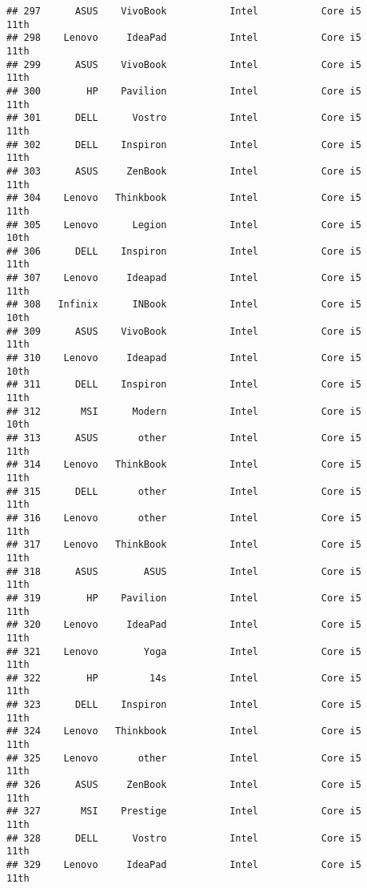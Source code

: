 \documentclass[
]{article}
\begin{document}
\begin{verbatim}
## 297      ASUS    VivoBook           Intel           Core i5            11th
## 298    Lenovo     IdeaPad           Intel           Core i5            11th
## 299      ASUS    VivoBook           Intel           Core i5            11th
## 300        HP    Pavilion           Intel           Core i5            11th
## 301      DELL      Vostro           Intel           Core i5            11th
## 302      DELL    Inspiron           Intel           Core i5            11th
## 303      ASUS     ZenBook           Intel           Core i5            11th
## 304    Lenovo   Thinkbook           Intel           Core i5            11th
## 305    Lenovo      Legion           Intel           Core i5            10th
## 306      DELL    Inspiron           Intel           Core i5            11th
## 307    Lenovo     Ideapad           Intel           Core i5            11th
## 308   Infinix      INBook           Intel           Core i5            10th
## 309      ASUS    VivoBook           Intel           Core i5            11th
## 310    Lenovo     Ideapad           Intel           Core i5            10th
## 311      DELL    Inspiron           Intel           Core i5            11th
## 312       MSI      Modern           Intel           Core i5            10th
## 313      ASUS       other           Intel           Core i5            11th
## 314    Lenovo   ThinkBook           Intel           Core i5            11th
## 315      DELL       other           Intel           Core i5            11th
## 316    Lenovo       other           Intel           Core i5            11th
## 317    Lenovo   ThinkBook           Intel           Core i5            11th
## 318      ASUS        ASUS           Intel           Core i5            11th
## 319        HP    Pavilion           Intel           Core i5            11th
## 320    Lenovo     IdeaPad           Intel           Core i5            11th
## 321    Lenovo        Yoga           Intel           Core i5            11th
## 322        HP         14s           Intel           Core i5            11th
## 323      DELL    Inspiron           Intel           Core i5            11th
## 324    Lenovo   Thinkbook           Intel           Core i5            11th
## 325    Lenovo       other           Intel           Core i5            11th
## 326      ASUS     ZenBook           Intel           Core i5            11th
## 327       MSI    Prestige           Intel           Core i5            11th
## 328      DELL      Vostro           Intel           Core i5            11th
## 329    Lenovo     IdeaPad           Intel           Core i5            11th

\end{verbatim}
\end{document}
